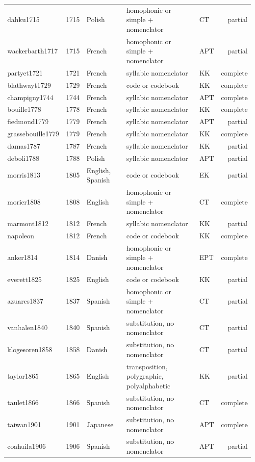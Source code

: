 {\begin{longtable}{@{}lrlllr@{}}
dahku1715 & 1715 & Polish & homophonic or simple + nomenclator & CT & partial \\
wackerbarth1717 & 1715 & French & homophonic or simple + nomenclator & APT & partial \\
partyet1721 & 1721 & French & syllabic nomenclator & KK & complete \\
blathwayt1729 & 1729 & French & code or codebook & KK & complete \\
champigny1744 & 1744 & French & syllabic nomenclator & APT & complete \\
bouille1778 & 1778 & French & syllabic nomenclator & KK & complete \\
fiedmond1779 & 1779 & French & syllabic nomenclator & APT & partial \\
grassebouille1779 & 1779 & French & syllabic nomenclator & KK & complete \\
damas1787 & 1787 & French & syllabic nomenclator & KK & partial \\
deboli1788 & 1788 & Polish & syllabic nomenclator & APT & partial \\
morris1813 & 1805 & English, Spanish & code or codebook & EK & partial \\
morier1808 & 1808 & English & homophonic or simple + nomenclator & CT & complete \\
marmont1812 & 1812 & French & syllabic nomenclator & KK & partial \\
napoleon & 1812 & French & code or codebook & KK & complete \\
anker1814 & 1814 & Danish & homophonic or simple + nomenclator & EPT & complete \\
everett1825 & 1825 & English & code or codebook & KK & partial \\
azuares1837 & 1837 & Spanish & homophonic or simple + nomenclator & CT & partial \\
vanhalen1840 & 1840 & Spanish & substitution, no nomenclator & CT & partial \\
klogesoren1858 & 1858 & Danish & substitution, no nomenclator & CT & partial \\
taylor1865 & 1865 & English & transposition, polygraphic, polyalphabetic & KK & partial \\
taulet1866 & 1866 & Spanish & substitution, no nomenclator & CT & complete \\
taiwan1901 & 1901 & Japanese & substitution, no nomenclator & APT & complete \\
coahuila1906 & 1906 & Spanish & substitution, no nomenclator & APT & partial \\

\end{longtable}}
